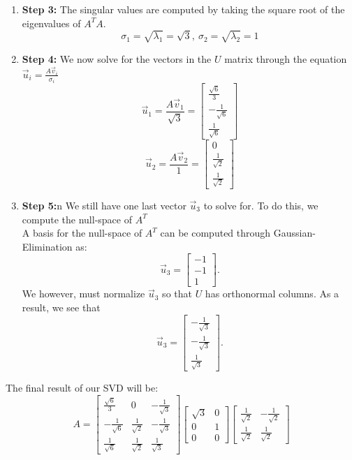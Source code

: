 \begin{enumerate}
{\begin{enumerate}[label=(\roman*)]
        Remember to normalize these vectors since they form the $V$ matrix.
      \item \textbf{Step 3:}
        The singular values are computed by taking the square root of the eigenvalues of $A^{T}A.$
        $$\sigma_{1} = \sqrt{\lambda_{1}} = \sqrt{3}, \ \sigma_{2} = \sqrt{\lambda_{2}} = 1$$
      \item \textbf{Step 4:}
        We now solve for the vectors in the $U$ matrix through the equation $\vec{u}_i = \frac{A \vec{v}_i}{\sigma_i}$
        $$\vec{u}_{1} = \frac{A \vec{v}_{1}}{\sqrt{3}} = 
        \begin{bmatrix} \frac{\sqrt{6}}{3} \\ -\frac{1}{\sqrt{6}} \\ \frac{1}{\sqrt{6}} \end{bmatrix}$$
        $$\vec{u}_{2} = \frac{A \vec{v}_{2}}{1} = 
        \begin{bmatrix} 0 \\ \frac{1}{\sqrt{2}} \\ \frac{1}{\sqrt{2}} \end{bmatrix}$$
      \item \textbf{Step 5:}n
        We still have one last vector $\vec{u}_{3}$ to solve for. To do this, we compute the null-space of $A^{T}$ \\
        A basis for the null-space of $A^{T}$ can be computed through Gaussian-Elimination as:
        $$\vec{u}_{3} = \begin{bmatrix} -1 \\ -1 \\ 1 \end{bmatrix}.$$
        We however, must normalize $\vec{u}_{3}$ so that $U$ has orthonormal columns. As a result, we see that
        $$\vec{u}_{3} = \begin{bmatrix} -\frac{1}{\sqrt{3}} \\ - \frac{1}{\sqrt{3}} \\ \frac{1}{\sqrt{3}} \end{bmatrix}.$$
    \end{enumerate}
    The final result of our SVD will be:
    \begin{equation}
      A = \begin{bmatrix} \frac{\sqrt{6}}{3} & 0 & -\frac{1}{\sqrt{3}} \\
      -\frac{1}{\sqrt{6}} & \frac{1}{\sqrt{2}} & -\frac{1}{\sqrt{3}} \\
      \frac{1}{\sqrt{6}} & \frac{1}{\sqrt{2}} & \frac{1}{\sqrt{3}} \end{bmatrix}
      \begin{bmatrix} \sqrt{3} & 0  \\ 0 & 1 \\ 0 & 0 \end{bmatrix} 
      \begin{bmatrix} \frac{1}{\sqrt{2}} & -\frac{1}{\sqrt{2}} \\ \frac{1}{\sqrt{2}} & \frac{1}{\sqrt{2}} \end{bmatrix}
    \end{equation}
  }
\end{enumerate}









